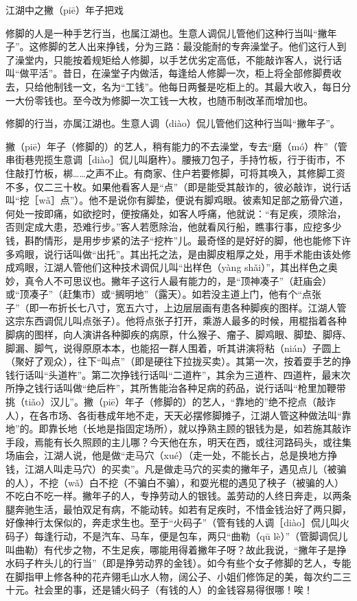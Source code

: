 \documentclass[12pt,UTF8]{ctexbook}
\begin{document}
江湖中之撇（piē）年子把戏


修脚的人是一种手艺行当，也属江湖也。生意人调侃儿管他们这种行当叫“撇年子”。这修脚的艺人出来挣钱，分为三路：最没能耐的专奔澡堂子。他们这行人到了澡堂内，只能按着规矩给人修脚，以手艺优劣定高低，不能敲诈客人，说行话叫“做平活”。昔日，在澡堂子内做活，每逢给人修脚一次，柜上将全部修脚费收去，只给他制钱一文，名为“工钱”。他每日两餐是吃柜上的。其最大收入，每日分一大份零钱也。至今改为修脚一次工钱一大枚，也随币制改革而增加也。

修脚的行当，亦属江湖也。生意人调（diào）侃儿管他们这种行当叫“撇年子”。



撇（piē）年子（修脚的）的艺人，稍有能力的不去澡堂，专去“磨（mó）杵”（管串街巷兜揽生意调［diào］侃儿叫磨杵）。腰掖刀包子，手持竹板，行于街市，不住敲打竹板，梆……之声不止。有商家、住户若要修脚，可将其唤入，其修脚工资不多，仅二三十枚。如果他看客人是“点”（即是能受其敲诈的，彼必敲诈，说行话叫“挖［wǎ］点”）。他不是说你有脚垫，便说有脚鸡眼。彼素知足部之筋骨穴道，何处一按即痛，如欲挖时，便按痛处，如客人呼痛，他就说：“有足疾，须除治，否则定成大患，恐难行步。”客人若愿除治，他就看风行船，瞧事行事，应挖多少钱，斟酌情形，是用步步紧的法子“挖杵”儿。最奇怪的是好好的脚，他也能修下许多鸡眼，说行话叫做“出托”。其出托之法，是由脚皮粗厚之处，用手术能由该处修成鸡眼，江湖人管他们这种技术调侃儿叫“出样色（yàng shǎi）”，其出样色之奥妙，真令人不可思议也。撇年子这行人最有能力的，是“顶神凑子”（赶庙会）或“顶凑子”（赶集市）或“搁明地”（露天）。如若没主道上门，他有个“点张子”（即一布折长七八寸，宽五六寸，上边层层画有患各种脚疾的图样。江湖人管这宗东西调侃儿叫点张子）。他将点张子打开，乘游人最多的时候，用棍指着各种脚病的图样，向人演讲各种脚疾的病原，什么猴子、瘤子、脚鸡眼、脚垫、脚痔、脚漏、脚气，说得原原本本，也能招一群人围着，听其讲演将粘（nián）子圆上（聚好了观众），往下“叫点”（即是硬往下拉拢买卖）。其第一次，按着耍手艺的挣钱行话叫“头道杵”。第二次挣钱行话叫“二道杵”，其余为三道杵、四道杵，最末次所挣之钱行话叫做“绝后杵”，其所售能治各种足病的药品，说行话叫“枪里加鞭带挑（tiǎo）汉儿”。撇（piē）年子（修脚的）的艺人，“靠地的”绝不挖点（敲诈人），在各市场、各街巷成年地不走，天天必摆修脚摊子，江湖人管这种做法叫“靠地”的。即靠长地（长地是指固定场所），就以挣熟主顾的银钱为是，如若施其敲诈手段，焉能有长久照顾的主儿哪？今天他在东，明天在西，或往河路码头，或往集场庙会，江湖人说，他是做“走马穴（xué）（走一处，不能长占，总是换地方挣钱，江湖人叫走马穴）的买卖”。凡是做走马穴的买卖的撇年子，遇见点儿（被骗的人），不挖（wǎ）白不挖（不骗白不骗），和耍光棍的遇见了秧子（被骗的人）不吃白不吃一样。撇年子的人，专挣劳动人的银钱。盖劳动的人终日奔走，以两条腿奔驰生活，最怕双足有病，不能动转。如若有足疾时，不惜金钱治好了两只脚，好像神行太保似的，奔走求生也。至于“火码子”（管有钱的人调［diào］侃儿叫火码子）每逢行动，不是汽车、马车，便是包车，两只“曲勒（qū lè）”（管脚调侃儿叫曲勒）有代步之物，不生足疾，哪能用得着撇年子呀？故此我说，“撇年子是挣水码子杵头儿的行当”（即是挣劳动界的金钱）。如今有些个女子修脚的艺人，专能在脚指甲上修各种的花卉翎毛山水人物，阔公子、小姐们修饰足的美，每次约二三十元。社会里的事，还是铺火码子（有钱的人）的金钱容易得很哪！唉！
\end{document}
